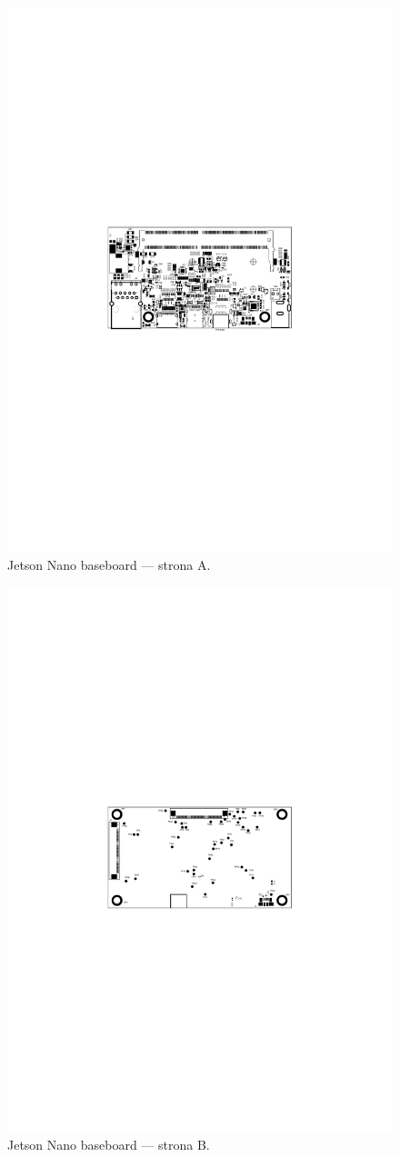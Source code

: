 \begin{figure}[H]
	\centering
	\includegraphics[width=0.7\linewidth,clip, trim=5.5cm 12cm 5.5cm 11cm]{./chapters/chapter5/Jetson_A.pdf}
	\caption{Jetson Nano baseboard --- strona A.}\label{jetson:StronaA}
\end{figure}


\begin{figure}[H]
	\centering
	\includegraphics[width=0.7\linewidth,clip, trim=5.5cm 12cm 5.5cm 11cm]{./chapters/chapter5/Jetson_B.pdf}
	\caption{Jetson Nano baseboard --- strona B.}\label{jetson:StronaB}
\end{figure}

